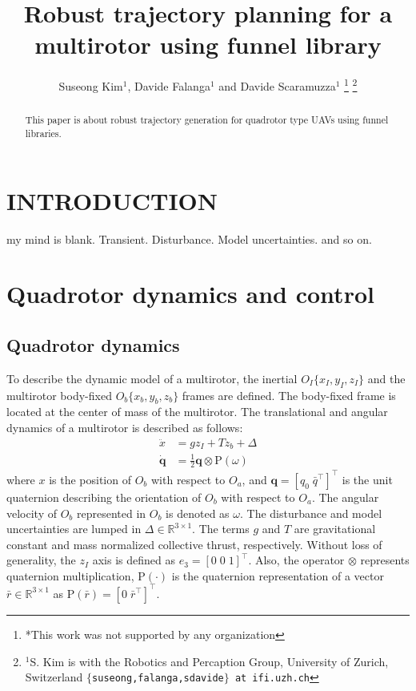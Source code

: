 \documentclass[letterpaper, 10 pt, conference]{ieeeconf}  %
\title{\LARGE \bf
Robust trajectory planning for a multirotor using funnel library
}
\author{Suseong Kim$^{1}$, Davide Falanga$^{1}$ and Davide Scaramuzza$^{1}$%
\thanks{*This work was not supported by any organization}%
\thanks{$^{1}$S. Kim is with the Robotics and Percaption Group, University of Zurich, Switzerland
        {\tt\small $\{$suseong,falanga,sdavide$\}$ at ifi.uzh.ch}}%
}
\begin{document}
\maketitle
\thispagestyle{empty}
\pagestyle{empty}


\begin{abstract}

This paper is about robust trajectory generation for quadrotor type UAVs using funnel libraries.

\end{abstract}


\section{INTRODUCTION}

my mind is blank.
Transient. Disturbance. Model uncertainties. and so on.

\section{Quadrotor dynamics and control}

\subsection{Quadrotor dynamics}
To describe the dynamic model of a multirotor, the inertial $O_I\{x_I,y_I,z_I\}$ and the multirotor body-fixed $O_b\{x_b,y_b,z_b\}$ frames are defined. The body-fixed frame is located at the center of mass of the multirotor. 
The translational and angular dynamics of a multirotor is described as follows:
\begin{align}
\ddot{x} &= gz_I + Tz_b + \Delta \label{eq:translational} \\
\dot{\textbf{q}} &= \textstyle{\frac{1}{2}}\textbf{q}\otimes \text{P}(\omega) \label{eq:rotational}
\end{align}
where $x$ is the position of $O_b$ with respect to $O_a$, and $\textbf{q} = [q_0\;\bar{q}^\intercal]^\intercal$ is the unit quaternion describing the orientation of $O_b$ with respect to $O_a$.
The angular velocity of $O_b$ represented in $O_b$ is denoted as $\omega$.
The disturbance and model uncertainties are lumped in $\Delta \in \mathbb{R}^{3\times 1}$. 
The terms $g$ and $T$ are gravitational constant and mass normalized collective thrust, respectively. Without loss of generality, the $z_I$ axis is defined as $e_3 = [0\;0\;1]^\intercal$. Also, the operator $\otimes$ represents quaternion multiplication, $\text{P}(\cdot)$ is the quaternion representation of a vector $\bar{r} \in \mathbb{R}^{3\times 1}$ as $\text{P}(\bar{r}) = [0\;\bar{r}^\intercal]^\intercal$. 
\end{document}
